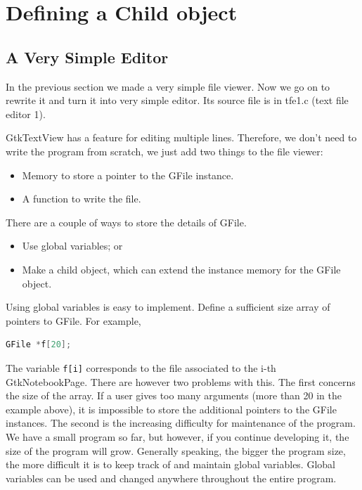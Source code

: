 \hypertarget{defining-a-child-object}{%
\section{Defining a Child object}\label{defining-a-child-object}}

\hypertarget{a-very-simple-editor}{%
\subsection{A Very Simple Editor}\label{a-very-simple-editor}}

In the previous section we made a very simple file viewer. Now we go on
to rewrite it and turn it into very simple editor. Its source file is in
tfe1.c (text file editor 1).

GtkTextView has a feature for editing multiple lines. Therefore, we
don't need to write the program from scratch, we just add two things to
the file viewer:

\begin{itemize}
\tightlist
\item
  Memory to store a pointer to the GFile instance.
\item
  A function to write the file.
\end{itemize}

There are a couple of ways to store the details of GFile.

\begin{itemize}
\tightlist
\item
  Use global variables; or
\item
  Make a child object, which can extend the instance memory for the
  GFile object.
\end{itemize}

Using global variables is easy to implement. Define a sufficient size
array of pointers to GFile. For example,

\begin{lstlisting}[language=C]
GFile *f[20];
\end{lstlisting}

The variable \passthrough{\lstinline!f[i]!} corresponds to the file
associated to the i-th GtkNotebookPage. There are however two problems
with this. The first concerns the size of the array. If a user gives too
many arguments (more than 20 in the example above), it is impossible to
store the additional pointers to the GFile instances. The second is the
increasing difficulty for maintenance of the program. We have a small
program so far, but however, if you continue developing it, the size of
the program will grow. Generally speaking, the bigger the program size,
the more difficult it is to keep track of and maintain global variables.
Global variables can be used and changed anywhere throughout the entire
program.

